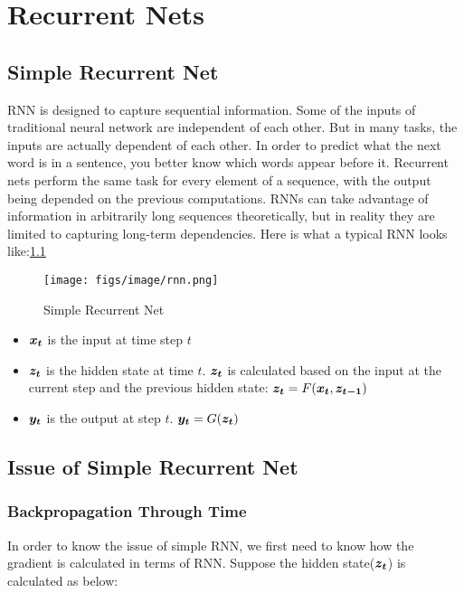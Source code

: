 \chapter{Recurrent Nets}

\section{Simple Recurrent Net}
\label{sec:SimpleRecNet}

RNN is designed to capture sequential information.
Some of the inputs of traditional neural network are independent of each other.
But in many tasks, the inputs are actually dependent of each other.
In order to predict what the next word is in a sentence, you better know which words appear before it.
Recurrent nets perform the same task for every element of a sequence, with the output being depended on the previous computations. 
RNNs can take advantage of information in arbitrarily long sequences theoretically, but in reality they are limited to capturing long-term dependencies.
Here is what a typical RNN looks like:\cref{fig:Simple RNN}

\begin{figure}[h]
    \centering
    \texttt{[image: figs/image/rnn.png]}
    \caption{Simple Recurrent Net}
    \label{fig:Simple RNN}
\end{figure}

\begin{itemize}
  \item $\vect{x_{t}}$ is the input at time step $t$
  \item $\vect{z_{t}}$ is the hidden state at time $t$. $\vect{z_{t}}$ is calculated based on the input at the current step and the previous hidden state:
  $\vect{z_t} = F(\vect{x_t}, \vect{z_{t-1}})$
  \item $\vect{y_t}$ is the output at step $t$. $\vect{y_t} = G(\vect{z_t})$
\end{itemize}



\section{Issue of Simple Recurrent Net}
\subsection{Backpropagation Through Time}
In order to know the issue of simple RNN, we first need to know how the gradient is calculated in terms of RNN. Suppose the hidden state($\vect{z_t}$) is calculated as below:

